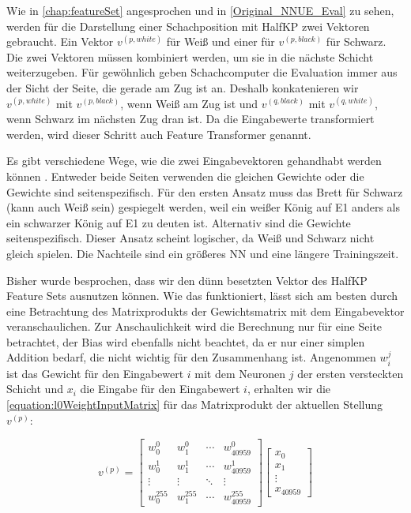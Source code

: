 Wie in \autoref{chap:featureSet} angesprochen und in \autoref{Original_NNUE_Eval} zu sehen, werden für die Darstellung einer Schachposition mit HalfKP zwei Vektoren gebraucht. Ein Vektor $v^{(p,white)}$ für Weiß und einer für $v^{(p,black)}$ für Schwarz. Die zwei Vektoren müssen kombiniert werden, um sie in die nächste Schicht weiterzugeben. Für gewöhnlich geben Schachcomputer die Evaluation immer aus der Sicht der Seite, die gerade am Zug ist an. Deshalb konkatenieren wir $v^{(p,white)}$ mit $v^{(p,black)}$, wenn Weiß am Zug ist und $v^{(q,black)}$ mit $v^{(q,white)}$, wenn Schwarz im nächsten Zug dran ist. Da die Eingabewerte transformiert werden, wird dieser Schritt auch Feature Transformer genannt.

Es gibt verschiedene Wege, wie die zwei Eingabevektoren gehandhabt werden können \cite{StockfishNNUE}. Entweder beide Seiten verwenden die gleichen Gewichte oder die Gewichte sind seitenspezifisch. Für den ersten Ansatz muss das Brett für Schwarz (kann auch Weiß sein) gespiegelt werden, weil ein weißer König auf E1 anders als ein schwarzer König auf E1 zu deuten ist. Alternativ sind die Gewichte seitenspezifisch. Dieser Ansatz scheint logischer, da Weiß und Schwarz nicht gleich spielen. Die Nachteile sind ein größeres \ac{NN} und eine längere Trainingszeit.

Bisher wurde besprochen, dass wir den dünn besetzten Vektor des HalfKP Feature Sets ausnutzen können. Wie das funktioniert, lässt sich am besten durch eine Betrachtung des Matrixprodukts der Gewichtsmatrix mit dem Eingabevektor veranschaulichen. Zur Anschaulichkeit wird die Berechnung nur für eine Seite betrachtet, der Bias wird ebenfalls nicht beachtet, da er nur einer simplen Addition bedarf, die nicht wichtig für den Zusammenhang ist. Angenommen $w_{i}^{j}$ ist das Gewicht für den Eingabewert $i$ mit dem Neuronen $j$ der ersten versteckten Schicht und $x_{i}$ die Eingabe für den Eingabewert $i$, erhalten wir die \autoref{equation:l0WeightInputMatrix} für das Matrixprodukt der aktuellen Stellung $v^{(p)}$:

\begin{equation}
  v^{(p)}=\begin{bmatrix}
    w_{0}^{0}   & w_{1}^{0}   & \cdots & w_{40959}^{0}   \\
    w_{0}^{1}   & w_{1}^{1}   & \cdots & w_{40959}^{1}   \\
    \vdots      & \vdots      & \ddots & \vdots          \\
    w_{0}^{255} & w_{1}^{255} & \cdots & w_{40959}^{255}
  \end{bmatrix} \begin{bmatrix}
    x_{0}  \\
    x_{1}  \\
    \vdots \\
    x_{40959}
  \end{bmatrix}
  \label{equation:l0WeightInputMatrix}
\end{equation}

